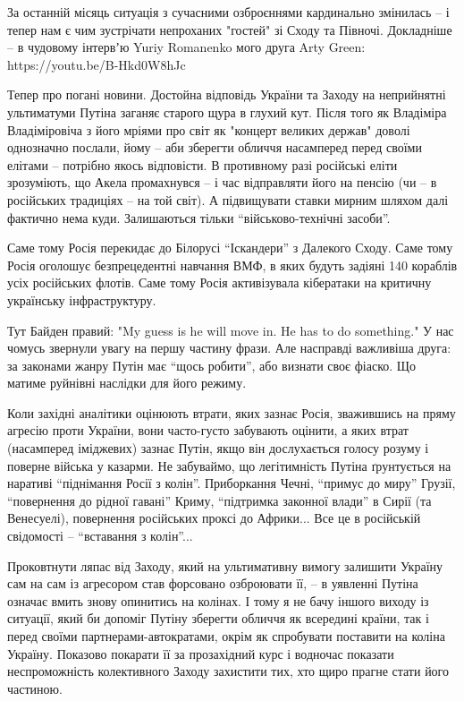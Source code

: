 За останній місяць ситуація з сучасними озброєннями кардинально змінилась – і
тепер нам є чим зустрічати непроханих "гостей" зі Сходу та Півночі. Докладніше
– в чудовому інтервʼю Yuriy Romanenko мого друга Arty Green:
https://youtu.be/B-Hkd0W8hJc

Тепер про погані новини. Достойна відповідь України та Заходу на неприйнятні
ультиматуми Путіна заганяє старого щура в глухий кут. Після того як Владіміра
Владіміровіча з його мріями про світ як "концерт великих держав" доволі
однозначно послали, йому – аби зберегти обличчя насамперед перед своїми елітами
– потрібно якось відповісти. В противному разі російські еліти зрозуміють, що
Акела промахнувся – і час відправляти його на пенсію (чи – в російських
традиціях – на той світ). А підвищувати ставки мирним шляхом далі фактично нема
куди. Залишаються тільки \enquote{військово-технічні засоби}. 

Саме тому Росія перекидає до Білорусі \enquote{Іскандери} з Далекого Сходу. Саме тому
Росія оголошує безпрецедентні навчання ВМФ, в яких будуть задіяні 140 кораблів
усіх російських флотів. Саме тому Росія активізувала кібератаки на критичну
українську інфраструктуру.

Тут Байден правий: "My guess is he will move in. He has to do something." У нас
чомусь звернули увагу на першу частину фрази. Але насправді важливіша друга: за
законами жанру Путін має \enquote{щось робити}, або визнати своє фіаско. Що матиме
руйнівні наслідки для його режиму.

Коли західні аналітики оцінюють втрати, яких зазнає Росія, зважившись на пряму
агресію проти України, вони часто-густо забувають оцінити, а яких втрат
(насамперед іміджевих) зазнає Путін, якщо він дослухається голосу розуму і
поверне війська у казарми. Не забуваймо, що легітимність Путіна ґрунтується на
наративі \enquote{піднімання Росії з колін}. Приборкання Чечні, \enquote{примус до миру}
Грузії, \enquote{повернення до рідної гавані} Криму, \enquote{підтримка законної влади} в Сирії
(та Венесуелі), повернення російських проксі до Африки... Все це в російській
свідомості – \enquote{вставання з колін}...

Проковтнути ляпас від Заходу, який на ультимативну вимогу залишити Україну сам
на сам із агресором став форсовано озброювати її, – в уявленні Путіна означає
вмить знову опинитись на колінах. І тому я не бачу іншого виходу із ситуації,
який би допоміг Путіну зберегти обличчя як всередині країни, так і перед своїми
партнерами-автократами, окрім як спробувати поставити на коліна Україну.
Показово покарати її за прозахідний курс і водночас показати неспроможність
колективного Заходу захистити тих, хто щиро прагне стати його частиною.


